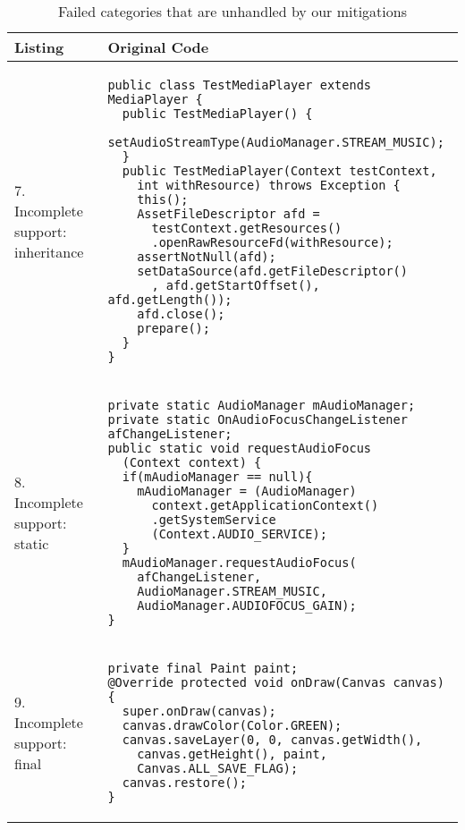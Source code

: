 \begin{table}
	\caption{Failed categories that are unhandled by our mitigations}\label{tab:mitigatefail}
\centering
\begin{tabular}{|p{}|p{}|}
\hline
\textbf{Listing}
  &
  \textbf{Original Code}
 \\ \hline
7. Incomplete support: inheritance
&
\begin{lstlisting}
public class TestMediaPlayer extends MediaPlayer {
  public TestMediaPlayer() {
    setAudioStreamType(AudioManager.STREAM_MUSIC);
  }
  public TestMediaPlayer(Context testContext,
    int withResource) throws Exception {
    this();
    AssetFileDescriptor afd =
      testContext.getResources()
      .openRawResourceFd(withResource);
    assertNotNull(afd);
    setDataSource(afd.getFileDescriptor()
      , afd.getStartOffset(), afd.getLength());
    afd.close();
    prepare();
  }
}
\end{lstlisting}
\\ \hline
8. Incomplete support: static
&
\begin{lstlisting}
private static AudioManager mAudioManager;
private static OnAudioFocusChangeListener afChangeListener;
public static void requestAudioFocus
  (Context context) {
  if(mAudioManager == null){
    mAudioManager = (AudioManager)
      context.getApplicationContext()
      .getSystemService
      (Context.AUDIO_SERVICE);
  }
  mAudioManager.requestAudioFocus(
    afChangeListener,
    AudioManager.STREAM_MUSIC,
    AudioManager.AUDIOFOCUS_GAIN);
}
\end{lstlisting}
\\ \hline
9. Incomplete support: final
&
\begin{lstlisting}
private final Paint paint;
@Override protected void onDraw(Canvas canvas) {
  super.onDraw(canvas);
  canvas.drawColor(Color.GREEN);
  canvas.saveLayer(0, 0, canvas.getWidth(),
    canvas.getHeight(), paint,
    Canvas.ALL_SAVE_FLAG);
  canvas.restore();
}
\end{lstlisting}
\\ \hline
 \end{tabular}
 \end{table}

